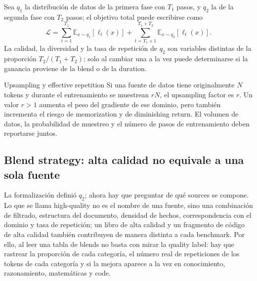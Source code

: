 Sea $q_1$ la distribución de datos de la primera fase con $T_1$ pasos, y $q_2$ la de la segunda fase con $T_2$ pasos; el objetivo total puede escribirse como
\[
\mathcal{L}=\sum_{t=1}^{T_1}\mathbb{E}_{x\sim q_1}[\ell_t(x)]
+\sum_{t=T_1+1}^{T_1+T_2}\mathbb{E}_{x\sim q_2}[\ell_t(x)].
\]
La calidad, la diversidad y la tasa de repetición de $q_2$ son variables distintas de la proporción $T_2/(T_1+T_2)$; solo al cambiar una a la vez puede determinarse si la ganancia proviene de la blend o de la duration.









\begin{knowledgebox}{Upsampling y effective repetition}
Si una fuente de datos tiene originalmente $N$ tokens y durante el entrenamiento se muestrean $rN$, el upsampling factor es $r$. Un valor $r>1$ aumenta el peso del gradiente de ese dominio, pero también incrementa el riesgo de memorization y de diminishing return. El volumen de datos, la probabilidad de muestreo y el número de pasos de entrenamiento deben reportarse juntos.
\end{knowledgebox}

\subsection{Blend strategy: alta calidad no equivale a una sola fuente}

La formalización definió $q_2$; ahora hay que preguntar de qué sources se compone. Lo que se llama high-quality no es el nombre de una fuente, sino una combinación de filtrado, estructura del documento, densidad de hechos, correspondencia con el dominio y tasa de repetición; un libro de alta calidad y un fragmento de código de alta calidad también contribuyen de manera distinta a cada benchmark. Por ello, al leer una tabla de blends no basta con mirar la quality label: hay que rastrear la proporción de cada categoría, el número real de repeticiones de los tokens de cada categoría y si la mejora aparece a la vez en conocimiento, razonamiento, matemáticas y code.

